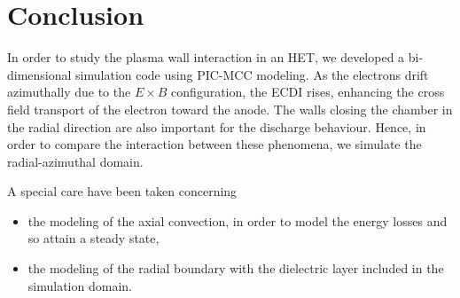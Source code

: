 


\section{Conclusion}
  \label{sec-conclusion_ch1}
  

  In order to study the plasma wall interaction in an \ac{HET}, we developed a bi-dimensional simulation code using \ac{PIC}-\ac{MCC} modeling.
  As the electrons drift azimuthally due to the $E \times B$ configuration, the \ac{ECDI} rises, enhancing the cross field transport of the electron toward the anode.
  The walls closing the chamber in the radial direction are also important for the discharge behaviour.
  Hence, in order to compare the interaction between these phenomena, we simulate the radial-azimuthal domain.
  
  A special care have been taken concerning
  \begin{itemize}
    \item the modeling of the axial convection, in order to model the energy losses and so attain a steady state,
    \item the modeling of the radial boundary with the dielectric layer included in the simulation domain.
  \end{itemize}
  
  
  